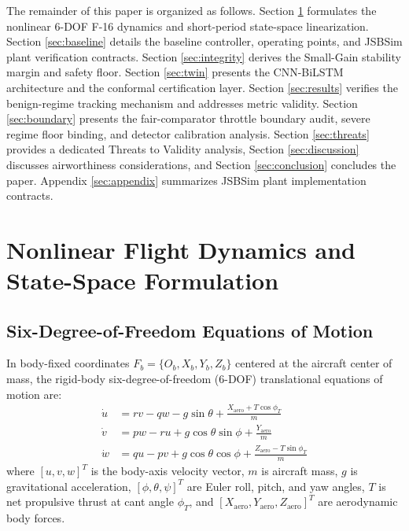\documentclass[review,12pt]{elsarticle}
\begin{document}
The remainder of this paper is organized as follows. Section \ref{sec:dynamics} formulates the nonlinear 6-DOF F-16 dynamics and short-period state-space linearization. Section \ref{sec:baseline} details the baseline controller, operating points, and JSBSim plant verification contracts. Section \ref{sec:integrity} derives the Small-Gain stability margin and safety floor. Section \ref{sec:twin} presents the CNN-BiLSTM architecture and the conformal certification layer. Section \ref{sec:results} verifies the benign-regime tracking mechanism and addresses metric validity. Section \ref{sec:boundary} presents the fair-comparator throttle boundary audit, severe regime floor binding, and detector calibration analysis. Section \ref{sec:threats} provides a dedicated Threats to Validity analysis, Section \ref{sec:discussion} discusses airworthiness considerations, and Section \ref{sec:conclusion} concludes the paper. Appendix \ref{sec:appendix} summarizes JSBSim plant implementation contracts.

\section{Nonlinear Flight Dynamics and State-Space Formulation}
\label{sec:dynamics}

\subsection{Six-Degree-of-Freedom Equations of Motion}
In body-fixed coordinates $F_b = \{O_b, X_b, Y_b, Z_b\}$ centered at the aircraft center of mass, the rigid-body six-degree-of-freedom (6-DOF) translational equations of motion \cite{StevensLewis2003} are:
\begin{align}
    \dot{u} &= rv - qw - g \sin\theta + \frac{X_{\text{aero}} + T \cos\phi_T}{m} \label{eq:u_dot} \\
    \dot{v} &= pw - ru + g \cos\theta \sin\phi + \frac{Y_{\text{aero}}}{m} \label{eq:v_dot} \\
    \dot{w} &= qu - pv + g \cos\theta \cos\phi + \frac{Z_{\text{aero}} - T \sin\phi_T}{m} \label{eq:w_dot}
\end{align}
where $[u, v, w]^T$ is the body-axis velocity vector, $m$ is aircraft mass, $g$ is gravitational acceleration, $[\phi, \theta, \psi]^T$ are Euler roll, pitch, and yaw angles, $T$ is net propulsive thrust at cant angle $\phi_T$, and $[X_{\text{aero}}, Y_{\text{aero}}, Z_{\text{aero}}]^T$ are aerodynamic body forces.
\end{document}
